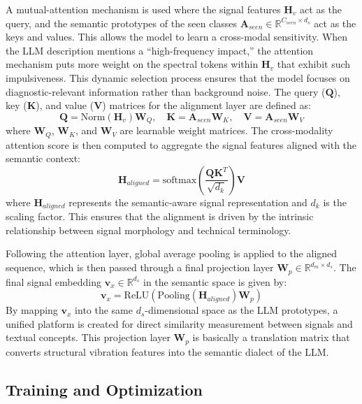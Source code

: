 \documentclass[journal]{IEEEtran}
\begin{document}
A mutual-attention mechanism is used where the signal features $\mathbf{H}_v$ act as the query, and the semantic prototypes of the seen classes $\mathbf{A}_{seen} \in \mathbb{R}^{C_{seen} \times d_s}$ act as the keys and values. This allows the model to learn a cross-modal sensitivity. When the LLM description mentions a ``high-frequency impact,'' the attention mechanism puts more weight on the spectral tokens within $\mathbf{H}_v$ that exhibit such impulsiveness. This dynamic selection process ensures that the model focuses on diagnostic-relevant information rather than background noise. The query ($\mathbf{Q}$), key ($\mathbf{K}$), and value ($\mathbf{V}$) matrices for the alignment layer are defined as:
\begin{equation}
\mathbf{Q} = \text{Norm}(\mathbf{H}_v) \mathbf{W}_Q, \quad \mathbf{K} = \mathbf{A}_{seen} \mathbf{W}_K, \quad \mathbf{V} = \mathbf{A}_{seen} \mathbf{W}_V
\end{equation}
where $\mathbf{W}_Q$, $\mathbf{W}_K$, and $\mathbf{W}_V$ are learnable weight matrices. The cross-modality attention score is then computed to aggregate the signal features aligned with the semantic context:
\begin{equation}
\mathbf{H}_{aligned} = \text{softmax}\left(\frac{\mathbf{Q}\mathbf{K}^T}{\sqrt{d_k}}\right) \mathbf{V}
\end{equation}
where $\mathbf{H}_{aligned}$ represents the semantic-aware signal representation and $d_k$ is the scaling factor. This ensures that the alignment is driven by the intrinsic relationship between signal morphology and technical terminology.

Following the attention layer, global average pooling is applied to the aligned sequence, which is then passed through a final projection layer $\mathbf{W}_p \in \mathbb{R}^{d_m \times d_s}$. The final signal embedding $\mathbf{v}_x \in \mathbb{R}^{d_s}$ in the semantic space is given by:
\begin{equation}
\mathbf{v}_x = \text{ReLU}(\text{Pooling}(\mathbf{H}_{aligned}) \mathbf{W}_p)
\end{equation}
By mapping $\mathbf{v}_x$ into the same $d_s$-dimensional space as the LLM prototypes, a unified platform is created for direct similarity measurement between signals and textual concepts. This projection layer $\mathbf{W}_p$ is basically a translation matrix that converts structural vibration features into the semantic dialect of the LLM.

\subsection{Training and Optimization}
\end{document}

